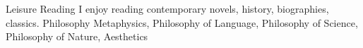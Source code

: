 



\begin{cvskills}
  \cvskill
    {Leisure Reading} %
    {I enjoy reading contemporary novels, history, biographies, classics.} %
  \cvskill
    {Philosophy} %
    {Metaphysics, Philosophy of Language, Philosophy of Science, Philosophy of Nature, Aesthetics} %
\end{cvskills}